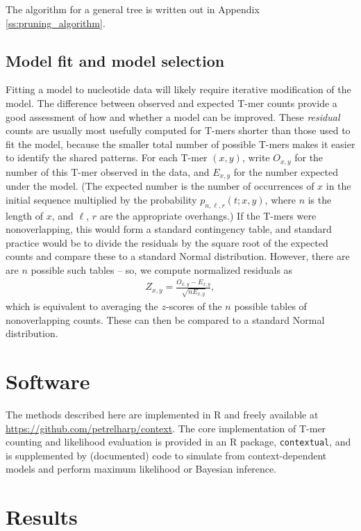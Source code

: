 \documentclass{article}
\theoremstyle{plain}
\theoremstyle{definition}
\begin{document}
The algorithm for a general tree is written out in Appendix \ref{ss:pruning_algorithm}.

\subsection{Model fit and model selection}
Fitting a model to nucleotide data will likely require iterative modification of the model.
The difference between observed and expected T-mer counts provide a good assessment of how and whether a model can be improved.
These \emph{residual} counts are usually most usefully computed for T-mers shorter than those used to fit the model,
because the smaller total number of possible T-mers makes it easier to identify the shared patterns.
For each T-mer $(x,y)$, write $O_{x,y}$ for the number of this T-mer observed in the data,
and $E_{x,y}$ for the number expected under the model.
(The expected number is the number of occurrences of $x$ in the initial sequence
multiplied by the probability $p_{n,\ell,r}(t;x,y)$, where $n$ is the length of $x$,
and $\ell$, $r$ are the appropriate overhangs.)
If the T-mers were nonoverlapping, this would form a standard contingency table,
and standard practice would be to divide the residuals by the square root of the expected counts
and compare these to a standard Normal distribution.
However, there are are $n$ possible such tables --
so, we compute normalized residuals as
\begin{align}
    Z_{x,y} = \frac{ O_{x,y} - E_{x,y} }{ \sqrt{n E_{x,y}} },
\end{align}
which is equivalent to averaging the $z$-scores of the $n$ possible tables of nonoverlapping counts.
These can then be compared to a standard Normal distribution.



\section{Software}

The methods described here
are implemented in R
and freely available at \url{https://github.com/petrelharp/context}.
The core implementation of T-mer counting and likelihood evaluation
is provided in an R package, \texttt{contextual},
and is supplemented by (documented) code to simulate from context-dependent models
and perform maximum likelihood or Bayesian inference.


\section{Results}
\end{document}
